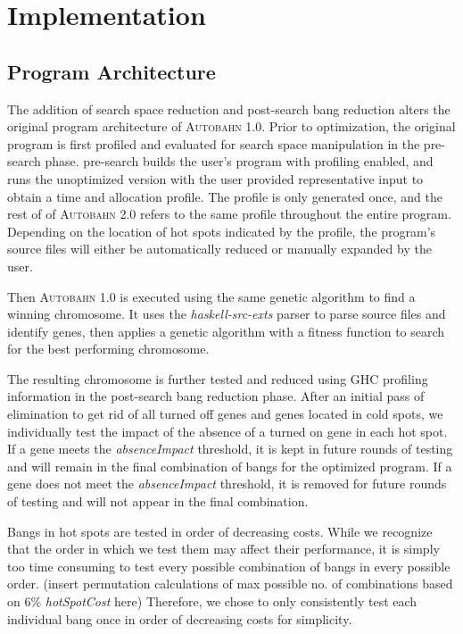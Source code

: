 \documentclass[format=sigplan, review=true]{acmart}
\newcommand{\hotspot}[0]{hot spot}
\newcommand{\hotspots}[0]{hot spots}
\newcommand{\coldspots}[0]{cold spots}
\newcommand{\hotspotcost}[0]{\textit{hotSpotCost}}
\newcommand{\Ao}[0]{\textsc{Autobahn 1.0}}
\newcommand{\At}[0]{\textsc{Autobahn 2.0}}
\newcommand{\preopt}[0]{pre-search}
\newcommand{\postopt}[0]{post-search}
\newcommand{\absim}[0]{\textit{absenceImpact}}
\begin{document}
\section{Implementation}

\subsection{Program Architecture}

The addition of search space reduction and \postopt{} bang reduction alters the original program architecture of \Ao{}. Prior to optimization, the original program is first profiled and evaluated for search space manipulation in the \preopt{} phase. \preopt{} builds the user's program with profiling enabled, and runs the unoptimized version with the user provided representative input to obtain a time and allocation profile. The profile is only generated once, and the rest of of \At{} refers to the same profile throughout the entire program. Depending on the location of \hotspots{} indicated by the profile, the program's source files will either be automatically reduced or manually expanded by the user. 

Then \Ao{} is executed using the same genetic algorithm to find a winning chromosome. It uses the \textit{haskell-src-exts} parser to parse source files and identify genes, then applies a genetic algorithm with a fitness function to search for the best performing chromosome.

The resulting chromosome is further tested and reduced using GHC profiling information in the \postopt{} bang reduction phase. After an initial pass of elimination to get rid of all turned off genes and genes located in \coldspots{}, we individually test the impact of the absence of a turned on gene in each \hotspot{}. If a gene meets the \absim{} threshold, it is kept in future rounds of testing and will remain in the final combination of bangs for the optimized program. If a gene does not meet the \absim{} threshold, it is removed for future rounds of testing and will not appear in the final combination. 

Bangs in \hotspots{} are tested in order of decreasing costs. While we recognize that the order in which we test them may affect their performance, it is simply too time consuming to test every possible combination of bangs in every possible order. (insert permutation calculations of max possible no. of combinations based on 6\% \hotspotcost{} here) Therefore, we chose to only consistently test each individual bang once in order of decreasing costs for simplicity. 
\end{document}

